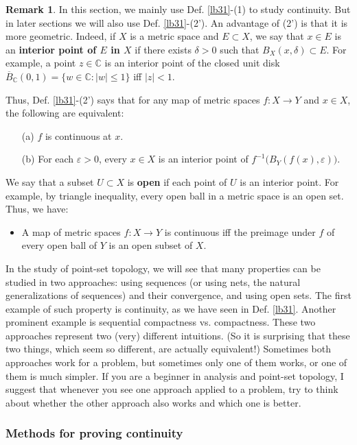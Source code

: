 \documentclass[12pt,b5paper,notitlepage]{article}
\theoremstyle{definition}
\newtheorem{rem}[df]{Remark}
\theoremstyle{plain}
\newcommand{\ovl}{\overline}
\newcommand{\Cbb}{\mathbb C}
\newcommand{\eps}{\varepsilon}
\numberwithin{equation}{section}
\begin{document}
\begin{rem}
In this section, we mainly use Def. \ref{lb31}-(1) to study continuity. But in later sections we will also use Def. \ref{lb31}-(2'). An advantage of (2') is that it is more geometric. Indeed, if $X$ is a metric space and $E\subset X$, we say that $x\in E$ is an \textbf{interior point of $E$ in $X$}  if there exists $\delta>0$ such that $B_X(x,\delta)\subset E$. For example, a point  $z\in\Cbb$ is an interior point of the closed unit disk $\ovl B_\Cbb(0,1)=\{w\in\Cbb:|w|\leq 1\}$ iff $|z|<1$. 

Thus, Def. \ref{lb31}-(2') says that for any map of metric spaces $f:X\rightarrow Y$ and $x\in X$, the following are equivalent:
\begin{itemize}
\item[(a)] $f$ is continuous at $x$.
\item[(b)] For each $\eps>0$, every $x\in X$ is an interior point of $f^{-1}\big(B_Y(f(x),\varepsilon)\big)$.
\end{itemize}
We say that a subset $U\subset X$ is \textbf{open}  if each point of $U$ is an interior point. For example, by triangle inequality, every open ball in a metric space is an open set. Thus, we have:
\begin{itemize}
\item A map of metric spaces $f:X\rightarrow Y$ is continuous iff the preimage under $f$ of every open ball of $Y$ is an open subset of $X$.
\end{itemize}

In the study of point-set topology, we will see that many properties can be studied in two approaches: using sequences (or using nets, the natural generalizations of sequences) and their convergence, and using open sets. The first example of such property is continuity, as we have seen in Def. \ref{lb31}. Another prominent example is sequential compactness vs. compactness. These two approaches represent two (very) different intuitions. (So it is surprising that these two things, which seem so different, are actually equivalent!) Sometimes both approaches work for a problem, but sometimes only one of them works, or one of them is much simpler. If you are a beginner in analysis and point-set topology, I suggest that whenever you see one approach applied to a problem, try to think about whether the other approach also works and which one is better.   \hfill\qedsymbol
\end{rem}


\subsubsection{Methods for proving continuity}
\end{document}
